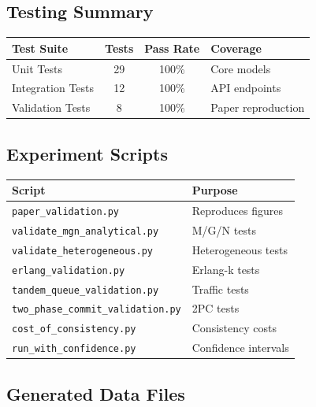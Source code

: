\documentclass[11pt,a4paper]{article}
\begin{document}
\subsection{Testing Summary}

\begin{center}
\begin{tabular}{lccl}
\toprule
\textbf{Test Suite} & \textbf{Tests} & \textbf{Pass Rate} & \textbf{Coverage} \\
\midrule
Unit Tests & 29 & 100\% & Core models \\
Integration Tests & 12 & 100\% & API endpoints \\
Validation Tests & 8 & 100\% & Paper reproduction \\
\bottomrule
\end{tabular}
\end{center}

\subsection{Experiment Scripts}

\begin{center}
\footnotesize
\begin{tabular}{ll}
\toprule
\textbf{Script} & \textbf{Purpose} \\
\midrule
\texttt{paper\_validation.py} & Reproduces figures \\
\texttt{validate\_mgn\_analytical.py} & M/G/N tests \\
\texttt{validate\_heterogeneous.py} & Heterogeneous tests \\
\texttt{erlang\_validation.py} & Erlang-k tests \\
\texttt{tandem\_queue\_validation.py} & Traffic tests \\
\texttt{two\_phase\_commit\_validation.py} & 2PC tests \\
\texttt{cost\_of\_consistency.py} & Consistency costs \\
\texttt{run\_with\_confidence.py} & Confidence intervals \\
\bottomrule
\end{tabular}
\end{center}

\subsection{Generated Data Files}
\end{document}
